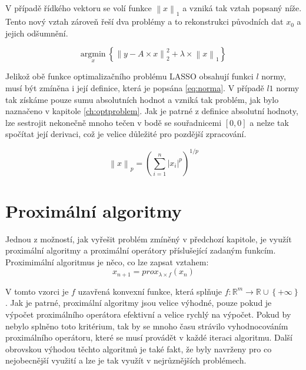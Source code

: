 \documentclass[FM,BP]{tulthesis}
\newcounter{Vzorce}
\begin{document}
V případě řídkého vektoru se volí funkce $\left\|x\right\|_1$ a vzniká tak vztah popsaný níže. Tento nový vztah zároveň řeší dva problémy a to rekonstrukci původních dat $x_0$ a jejich odšumnění.

\begin{equation} \label{eq:Konkretni LASSO} \tag{Vzorec \theVzorce}
\underset{x} {\mathrm{argmin}} ~\left\{\left\|y-A \times x\right\| ^2 _2+ \lambda \times \left\|x\right\|_1\right\}
\end{equation}

Jelikož obě funkce optimalizačního problému LASSO obsahují funkci $l$ normy, musí být zmíněna i její definice, která je popsána \ref{eq:norma}. V případě $l1$ normy tak získáme pouze sumu absolutních hodnot a vzniká tak problém, jak bylo naznačeno v kapitole \ref{ch:optproblem}. Jak je patrné z definice absolutní hodnoty, lze sestrojit nekonečně mnoho tečen v bodě se souřadnicemi $[0, 0]$ a nelze tak spočítat její derivaci, což je velice důležité pro pozdější zpracování.

\begin{equation} \label{eq:norma} \tag{Vzorec \theVzorce}
\left\|x\right\|_p = \left(\sum_{i=1}^{n} \left|x_i\right|^p\right)^{1/p}
\end{equation}

\chapter{Proximální algoritmy}
\label{ch:proxalg}
Jednou z možností, jak vyřešit problém zmíněný v předchozí kapitole, je využít proximální algoritmy a proximální operátory příslušející zadaným funkcím. Proximimální algoritmus je něco, co lze zapsat vztahem:
\begin{equation} \label{eq:proxAlg} \tag{Vzorec \theVzorce}
x_{n+1} = prox_{\lambda \times f}(x_{n})
\end{equation}

V tomto vzorci je $f$ uzavřená konvexní funkce, která splňuje $f : \mathbb{R}^{m} \rightarrow \mathbb{R} \cup \left\{+\infty\right\}$. Jak je patrné, proximální algoritmy jsou velice výhodné, pouze pokud je výpočet proximálního operátora efektivní a velice rychlý na výpočet. Pokud by nebylo splněno toto kritérium, tak by se mnoho času strávilo vyhodnocováním proximálního operátoru, které se musí provádět v každé iteraci algoritmu. Další obrovskou výhodou těchto algoritmů je také fakt, že byly navrženy pro co nejobecnější využití a lze je tak využít v nejrůznějších problémech.
\end{document}
